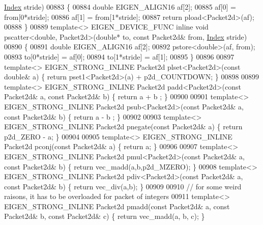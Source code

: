 \begin{DoxyCode}
{      \hyperlink{namespace_eigen_a62e77e0933482dafde8fe197d9a2cfde}{Index} stride)
00883 \{
00884   \textcolor{keywordtype}{double} EIGEN\_ALIGN16 af[2];
00885   af[0] = from[0*stride];
00886   af[1] = from[1*stride];
00887  \textcolor{keywordflow}{return} pload<Packet2d>(af);
00888 \}
00889 \textcolor{keyword}{template}<> EIGEN\_DEVICE\_FUNC \textcolor{keyword}{inline} \textcolor{keywordtype}{void} pscatter<double, Packet2d>(\textcolor{keywordtype}{double}* to, \textcolor{keyword}{const} Packet2d& from, 
      \hyperlink{namespace_eigen_a62e77e0933482dafde8fe197d9a2cfde}{Index} stride)
00890 \{
00891   \textcolor{keywordtype}{double} EIGEN\_ALIGN16 af[2];
00892   pstore<double>(af, from);
00893   to[0*stride] = af[0];
00894   to[1*stride] = af[1];
00895 \}
00896 
00897 \textcolor{keyword}{template}<> EIGEN\_STRONG\_INLINE Packet2d plset<Packet2d>(\textcolor{keyword}{const} \textcolor{keywordtype}{double}& a) \{ \textcolor{keywordflow}{return} pset1<Packet2d>(a) + 
      p2d\_COUNTDOWN; \}
00898 
00899 \textcolor{keyword}{template}<> EIGEN\_STRONG\_INLINE Packet2d padd<Packet2d>(\textcolor{keyword}{const} Packet2d& a, \textcolor{keyword}{const} Packet2d& b) \{ \textcolor{keywordflow}{return} a + b
      ; \}
00900 
00901 \textcolor{keyword}{template}<> EIGEN\_STRONG\_INLINE Packet2d psub<Packet2d>(\textcolor{keyword}{const} Packet2d& a, \textcolor{keyword}{const} Packet2d& b) \{ \textcolor{keywordflow}{return} a - b
      ; \}
00902 
00903 \textcolor{keyword}{template}<> EIGEN\_STRONG\_INLINE Packet2d pnegate(\textcolor{keyword}{const} Packet2d& a) \{ \textcolor{keywordflow}{return} p2d\_ZERO - a; \}
00904 
00905 \textcolor{keyword}{template}<> EIGEN\_STRONG\_INLINE Packet2d pconj(\textcolor{keyword}{const} Packet2d& a) \{ \textcolor{keywordflow}{return} a; \}
00906 
00907 \textcolor{keyword}{template}<> EIGEN\_STRONG\_INLINE Packet2d pmul<Packet2d>(\textcolor{keyword}{const} Packet2d& a, \textcolor{keyword}{const} Packet2d& b) \{ \textcolor{keywordflow}{return} 
      vec\_madd(a,b,p2d\_MZERO); \}
00908 \textcolor{keyword}{template}<> EIGEN\_STRONG\_INLINE Packet2d pdiv<Packet2d>(\textcolor{keyword}{const} Packet2d& a, \textcolor{keyword}{const} Packet2d& b) \{ \textcolor{keywordflow}{return} 
      vec\_div(a,b); \}
00909 
00910 \textcolor{comment}{// for some weird raisons, it has to be overloaded for packet of integers}
00911 \textcolor{keyword}{template}<> EIGEN\_STRONG\_INLINE Packet2d pmadd(\textcolor{keyword}{const} Packet2d& a, \textcolor{keyword}{const} Packet2d& b, \textcolor{keyword}{const} Packet2d& c) \{ \textcolor{keywordflow}{
      return} vec\_madd(a, b, c); \}
}
\end{DoxyCode}
